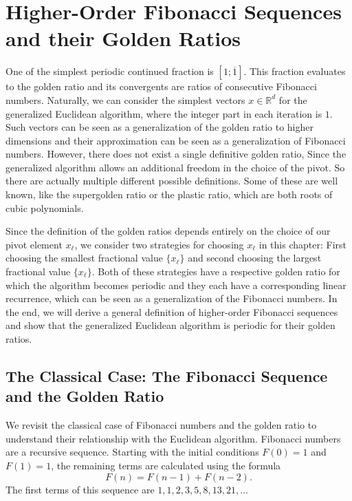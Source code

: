 \chapter{Higher-Order Fibonacci Sequences and their Golden Ratios}
\label{ch:fibonacci}

One of the simplest periodic continued fraction is $[1; \overline{1}]$.
This fraction evaluates to the golden ratio and its convergents are ratios of
consecutive Fibonacci numbers.
Naturally, we can consider the simplest vectors $x ∈ ℝ^d$ for the generalized
Euclidean algorithm, where the integer part in each iteration is $1$.
Such vectors can be seen as a generalization of the golden
ratio to higher dimensions and their approximation can be seen as a
generalization of Fibonacci numbers.
However, there does not exist a single definitive golden ratio,
Since the generalized algorithm allows an additional freedom in the choice of the pivot.
So there are actually multiple different possible definitions.
Some of these are well known, like the supergolden ratio or the plastic ratio,
which are both roots of cubic polynomials.

Since the definition of the golden ratios depends entirely on the choice of our
pivot element $x_ℓ$, we consider two strategies for choosing $x_ℓ$ in this
chapter: First choosing the smallest fractional value $\{x_ℓ\}$ and second
choosing the largest fractional value $\{x_ℓ\}$.
Both of these strategies have a respective golden ratio for which the algorithm
becomes periodic and they each have a corresponding linear recurrence, which
can be seen as a generalization of the Fibonacci numbers.
In the end, we will derive a general definition of higher-order Fibonacci
sequences and show that the generalized Euclidean algorithm is periodic for
their golden ratios.

\section{The Classical Case: The Fibonacci Sequence and the Golden Ratio}

We revisit the classical case of Fibonacci numbers and the golden ratio
to understand their relationship with the Euclidean algorithm.
Fibonacci numbers are a recursive sequence.
Starting with the initial conditions $F(0) = 1$ and $F(1) = 1$,
the remaining terms are calculated using the formula
\[
  F(n) = F(n-1) + F(n-2).
\]
The first terms of this sequence are $1, 1, 2, 3, 5, 8, 13, 21, …$

